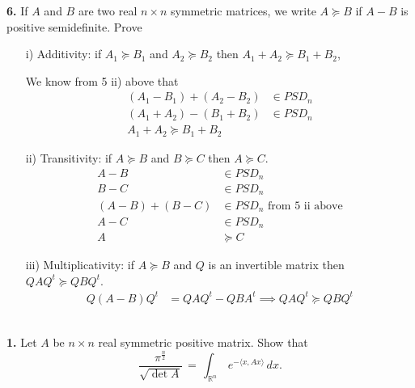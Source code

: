 \documentclass[11pt]{amsart}
\theoremstyle{definition}  %
\begin{document}
\vskip 0.2cm
\noindent
{\bf 6.} If $A$ and $B$ are two real $n \times n$ symmetric matrices, we write $A \succeq B$ if $A-B$ is positive semidefinite.  Prove
\begin{itemize}
\item[i)] Additivity:  if $A_1 \succeq B_1$ and $A_2 \succeq B_2$ then $A_1 + A_2 \succeq B_1  + B_2$, 

We know from 5 ii) above that 
\begin{align*}
	(A_1-B_1)+(A_2-B_2) &\in PSD_n\\
	(A_1 + A_2) -  (B_1  + B_2) &\in PSD_n \\
	A_1 + A_2 \succeq B_1  + B_2
\end{align*}

\item[ii)] Transitivity: if $A \succeq B$ and $B \succeq C$ then $A \succeq C$. 
\begin{align*}
	A -B &\in PSD_n\\
	B-C &\in PSD_n\\
	(A-B)+(B-C) &\in PSD_n \text{ from 5 ii above}\\
	A-C &\in PSD_n \\ 
	A &\succeq C
\end{align*}

\item[iii)] Multiplicativity:  if $A \succeq B$ and $Q$ is an invertible matrix then $Q A Q^t \succeq Q B Q^t$. 
\begin{align*}
	Q(A-B)Q^t &= QAQ^t-QBA^t \implies Q A Q^t \succeq Q B Q^t
\end{align*}

\end{itemize}






\vfill
\eject
{}\\

\vskip 0.2cm
\noindent
{\bf 1.} Let $A$ be $n \times n$ real symmetric positive matrix. Show that 
$$ \frac{\pi^{\frac{n}{2}}}{\sqrt{\det A}} \, = \, \int_{\mathbb{R}^n} \, e^{- \langle x, Ax \rangle} \, dx.$$


\end{document}
